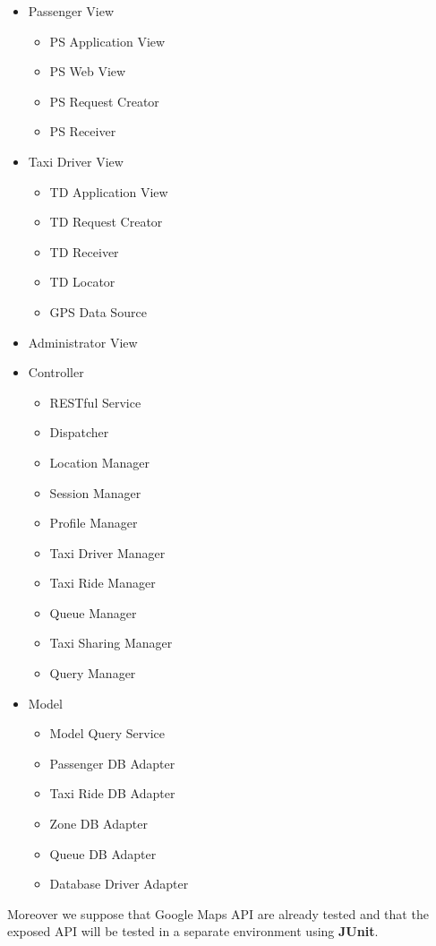 \begin{itemize}
	\item Passenger View
	\begin{itemize}
		\item PS Application View
		\item PS Web View
		\item PS Request Creator
		\item PS Receiver
	\end{itemize}
	\item Taxi Driver View
	\begin{itemize}
		\item TD Application View
		\item TD Request Creator
		\item TD Receiver
		\item TD Locator
		\item GPS Data Source
	\end{itemize}
	\item Administrator View
	\item Controller
	\begin{itemize}
		\item RESTful Service
		\item Dispatcher
		\item Location Manager
		\item Session Manager
		\item Profile Manager
		\item Taxi Driver Manager
		\item Taxi Ride Manager
		\item Queue Manager
		\item Taxi Sharing Manager
		\item Query Manager
	\end{itemize}
	\item Model
	\begin{itemize}
		\item Model Query Service
		\item Passenger DB Adapter
		\item Taxi Ride DB Adapter
		\item Zone DB Adapter
		\item Queue DB Adapter
		\item Database Driver Adapter
	\end{itemize}
\end{itemize}
Moreover we suppose that Google Maps API are already tested and that the exposed API will be tested in a separate environment using \textbf{JUnit}.
